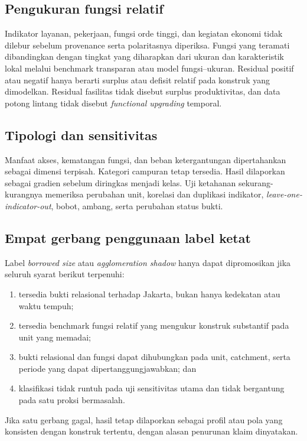 \documentclass[10pt]{article}
\begin{document}
\subsection{Pengukuran fungsi relatif}

Indikator layanan, pekerjaan, fungsi orde tinggi, dan kegiatan ekonomi tidak dilebur sebelum provenance serta polaritasnya diperiksa. Fungsi yang teramati dibandingkan dengan tingkat yang diharapkan dari ukuran dan karakteristik lokal melalui benchmark transparan atau model fungsi--ukuran. Residual positif atau negatif hanya berarti surplus atau defisit relatif pada konstruk yang dimodelkan. Residual fasilitas tidak disebut surplus produktivitas, dan data potong lintang tidak disebut \textit{functional upgrading} temporal.

\subsection{Tipologi dan sensitivitas}

Manfaat akses, kematangan fungsi, dan beban ketergantungan dipertahankan sebagai dimensi terpisah. Kategori campuran tetap tersedia. Hasil dilaporkan sebagai gradien sebelum diringkas menjadi kelas. Uji ketahanan sekurang-kurangnya memeriksa perubahan unit, korelasi dan duplikasi indikator, \textit{leave-one-indicator-out}, bobot, ambang, serta perubahan status bukti.

\subsection{Empat gerbang penggunaan label ketat}

Label \textit{borrowed size} atau \textit{agglomeration shadow} hanya dapat dipromosikan jika seluruh syarat berikut terpenuhi:
\begin{enumerate}
  \item tersedia bukti relasional terhadap Jakarta, bukan hanya kedekatan atau waktu tempuh;
  \item tersedia benchmark fungsi relatif yang mengukur konstruk substantif pada unit yang memadai;
  \item bukti relasional dan fungsi dapat dihubungkan pada unit, catchment, serta periode yang dapat dipertanggungjawabkan; dan
  \item klasifikasi tidak runtuh pada uji sensitivitas utama dan tidak bergantung pada satu proksi bermasalah.
\end{enumerate}

Jika satu gerbang gagal, hasil tetap dilaporkan sebagai profil atau pola yang konsisten dengan konstruk tertentu, dengan alasan penurunan klaim dinyatakan.
\end{document}
